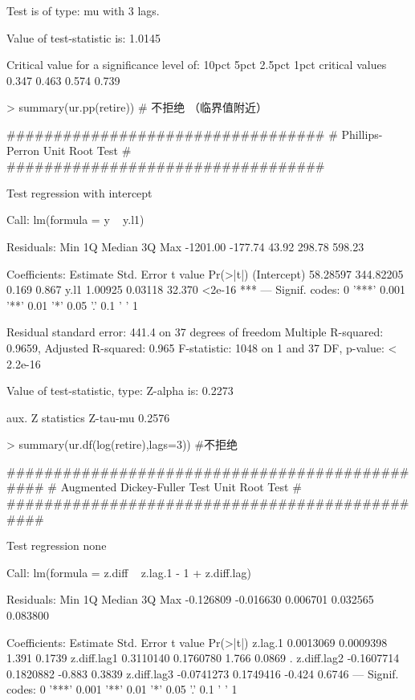 \documentclass{article}
\begin{document}
\begin{Schunk}
\begin{Soutput}
Test is of type: mu with 3 lags. 

Value of test-statistic is: 1.0145 

Critical value for a significance level of: 
                10pct  5pct 2.5pct  1pct
critical values 0.347 0.463  0.574 0.739
\end{Soutput}
\begin{Sinput}
> summary(ur.pp(retire)) # 不拒绝 （临界值附近）
\end{Sinput}
\begin{Soutput}
################################## 
# Phillips-Perron Unit Root Test # 
################################## 

Test regression with intercept 


Call:
lm(formula = y ~ y.l1)

Residuals:
     Min       1Q   Median       3Q      Max 
-1201.00  -177.74    43.92   298.78   598.23 

Coefficients:
             Estimate Std. Error t value Pr(>|t|)    
(Intercept)  58.28597  344.82205   0.169    0.867    
y.l1          1.00925    0.03118  32.370   <2e-16 ***
---
Signif. codes:  0 '***' 0.001 '**' 0.01 '*' 0.05 '.' 0.1 ' ' 1

Residual standard error: 441.4 on 37 degrees of freedom
Multiple R-squared:  0.9659,	Adjusted R-squared:  0.965 
F-statistic:  1048 on 1 and 37 DF,  p-value: < 2.2e-16


Value of test-statistic, type: Z-alpha  is: 0.2273 

         aux. Z statistics
Z-tau-mu            0.2576
\end{Soutput}
\begin{Sinput}
> summary(ur.df(log(retire),lags=3)) #不拒绝
\end{Sinput}
\begin{Soutput}
############################################### 
# Augmented Dickey-Fuller Test Unit Root Test # 
############################################### 

Test regression none 


Call:
lm(formula = z.diff ~ z.lag.1 - 1 + z.diff.lag)

Residuals:
      Min        1Q    Median        3Q       Max 
-0.126809 -0.016630  0.006701  0.032565  0.083800 

Coefficients:
              Estimate Std. Error t value Pr(>|t|)  
z.lag.1      0.0013069  0.0009398   1.391   0.1739  
z.diff.lag1  0.3110140  0.1760780   1.766   0.0869 .
z.diff.lag2 -0.1607714  0.1820882  -0.883   0.3839  
z.diff.lag3 -0.0741273  0.1749416  -0.424   0.6746  
---
Signif. codes:  0 '***' 0.001 '**' 0.01 '*' 0.05 '.' 0.1 ' ' 1


\end{Soutput}
\end{Schunk}
\end{document}
